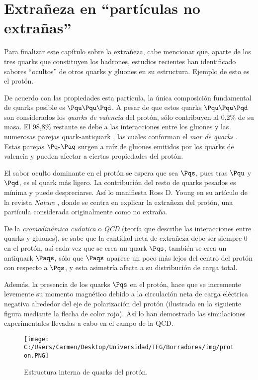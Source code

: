 \section{Extrañeza en ``partículas no extrañas''}
\label{cap:non-strange_particles}
Para finalizar este capítulo sobre la extrañeza, cabe mencionar que, aparte de los tres quarks que constituyen los hadrones, estudios recientes han identificado sabores ``ocultos'' de otros quarks y gluones en su estructura. Ejemplo de esto es el protón.

De acuerdo con las propiedades esta partícula, la única composición fundamental de quarks posible es $\Pqu\Pqu\Pqd$. A pesar de que estos quarks $\Pqu\Pqu\Pqd$ son considerados los \textit{quarks de valencia} del protón, sólo contribuyen al 0,2\% de su masa. El 98,8\% restante se debe a las interacciones entre los gluones y las numerosas parejas quark-antiquark \cite{Walker}, las cuales conforman el \textit{mar de quarks} \cite{Halzen}. Estas parejas $\Pq$-$\Paq$ surgen a raíz de gluones emitidos por los quarks de valencia \cite{Donelly} y pueden afectar a ciertas propiedades del protón. 

El sabor oculto dominante en el protón se espera que sea $\Pqs$, pues tras $\Pqu$ y $\Pqd$, es el quark más ligero. La contribución del resto de quarks pesados es mínima y puede despreciarse. Así lo manifiesta Ross D. Young en su artículo de la revista \textit{Nature} \cite{protonYoung}, donde se centra en explicar la extrañeza del protón, una partícula considerada originalmente como no extraña. 

De la \textit{cromodinámica cuántica} o \textit{QCD} (teoría que describe las interacciones entre quarks y gluones), se sabe que la cantidad neta de extrañeza debe ser siempre 0 en el protón, así cada vez que se crea un quark $\Pqs$, también se crea un antiquark $\Paqs$, sólo que $\Paqs$ aparece un poco más lejos del centro del protón con respecto a $\Pqs$, y esta asimetría afecta a su distribución de carga total. 

Además, la presencia de los quarks $\Pqs$ en el protón, hace que se incremente levemente su momento magnético debido a la circulación neta de carga eléctrica negativa alrededor del eje de polarización del protón (ilustrada en la siguiente figura mediante la flecha de color rojo). Así lo han demostrado las simulaciones experimentales llevadas a cabo en el campo de la QCD.

\begin{figure}[h!]
	\centering
	\texttt{[image: C:/Users/Carmen/Desktop/Universidad/TFG/Borradores/img/proton.PNG]}
	\caption[Estructura interna del protón]
	{Estructura interna de quarks del protón. \cite{protonYoung}}
	\label{fig:proton}
\end{figure}

